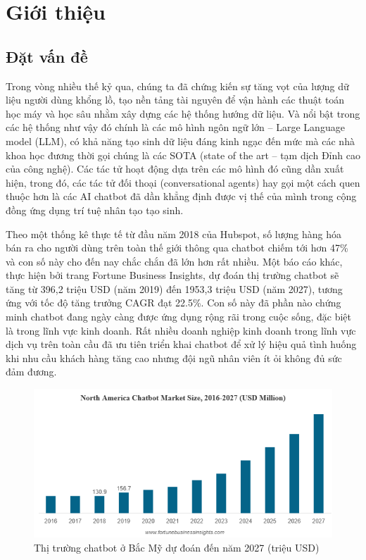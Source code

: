 \section{Giới thiệu}
\subsection{Đặt vấn đề}

Trong vòng nhiều thế kỷ qua, chúng ta đã chứng kiến sự tăng vọt của lượng dữ liệu người dùng khổng lồ, tạo nền tảng tài nguyên để vận hành các thuật toán học máy và học sâu nhằm xây dựng các hệ thống hướng dữ liệu. Và nổi bật trong các hệ thống như vậy đó chính là các mô hình ngôn ngữ lớn – Large Language model (LLM), có khả năng tạo sinh dữ liệu đáng kinh ngạc đến mức mà các nhà khoa học đương thời gọi chúng là các SOTA (state of the art – tạm dịch Đỉnh cao của công nghệ). Các tác tử hoạt động dựa trên các mô hình đó cũng dần xuất hiện, trong đó, các tác tử đối thoại (conversational agents) hay gọi một cách quen thuộc hơn là các AI chatbot đã dần khẳng định được vị thế của mình trong cộng đồng ứng dụng trí tuệ nhân tạo tạo sinh.

Theo một thống kê thực tế từ đầu năm 2018 của Hubspot, số lượng hàng hóa bán ra cho người dùng trên toàn thế giới thông qua chatbot chiếm tới hơn 47\% và con số này cho đến nay chắc chắn đã lớn hơn rất nhiều. Một báo cáo khác, thực hiện bởi trang Fortune Business Insights, dự đoán thị trường chatbot sẽ tăng từ 396,2 triệu USD (năm 2019) đến 1953,3 triệu USD (năm 2027), tương ứng với tốc độ tăng trưởng CAGR đạt 22.5\%. Con số này đã phần nào chứng minh chatbot đang ngày càng được ứng dụng rộng rãi trong cuộc sống, đặc biệt là trong lĩnh vực kinh doanh. Rất nhiều doanh nghiệp kinh doanh trong lĩnh vực dịch vụ trên toàn cầu đã ưu tiên triển khai chatbot để xử lý hiệu quả tình huống khi nhu cầu khách hàng tăng cao nhưng đội ngũ nhân viên ít ỏi không đủ sức đảm đương.

\begin{figure}[!ht]
    \centering
    \includegraphics[width=\linewidth]{Images/P1/da2.png}
    \vspace{0.5cm}
    \caption{Thị trường chatbot ở Bắc Mỹ dự đoán đến năm 2027 (triệu USD)}
\end{figure}

